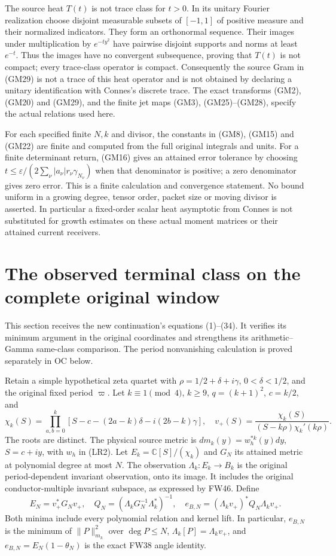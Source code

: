 The source heat $T(t)$ is not trace class for $t>0$.  In its unitary
Fourier realization choose disjoint measurable subsets of $[-1,1]$
of positive measure and their normalized indicators.  They form an
orthonormal sequence.  Their images under multiplication by
$e^{-ty^2}$ have pairwise disjoint supports and norms at least
$e^{-t}$.  Thus the images have no convergent subsequence, proving
that $T(t)$ is not compact; every trace-class operator is compact.
Consequently the source Gram in (GM29) is not a trace of this heat
operator and is not obtained by declaring a unitary identification
with Connes's discrete trace.  The exact transforms (GM2), (GM20)
and (GM29), and the finite jet maps (GM3), (GM25)--(GM28), specify
the actual relations used here.

For each specified finite $N,k$ and divisor, the constants in
(GM8), (GM15) and (GM22) are finite and computed from the full
original integrals and units.  For a finite determinant return,
(GM16) gives an attained error tolerance by choosing
$t\leq\varepsilon/(2\sum_\nu|a_\nu|r_\nu\gamma_{N_\nu})$
when that denominator is positive; a zero denominator gives zero
error.  This is a finite calculation and convergence statement.
No bound uniform in a growing degree, tensor order, packet size or
moving divisor is asserted.  In particular a fixed-order scalar
heat asymptotic from Connes is not substituted for growth estimates
on these actual moment matrices or their attained current receivers.

\section{The observed terminal class on the complete original window}
This section receives the new continuation's equations (1)--(34).
It verifies its minimum argument in the original coordinates and
strengthens its arithmetic--Gamma same-class comparison. The period
nonvanishing calculation is proved separately in OC below.

Retain a simple hypothetical zeta quartet with
$\rho=1/2+\delta+i\gamma$, $0<\delta<1/2$, and the original fixed
period $\varpi$. Let $k\equiv1\pmod4$, $k\ge9$,
$q=(k+1)^2$, $c=k/2$, and
\[
 \chi_k(S)=\prod_{a,b=0}^k[S-c-(2a-k)\delta-i(2b-k)\gamma],\quad
 v_+(S)=\frac{\chi_k(S)}{(S-k\rho)\chi_k'(k\rho)}.\tag{OB1}
\]
The roots are distinct. The physical source metric is
$dm_k(y)=w_h^{*k}(y)dy$, $S=c+iy$, with $w_h$ in (LR2).
Let $E_k=\mathbb C[S]/(\chi_k)$ and $G_N$ its attained metric at
polynomial degree at most $N$. The observation $\Lambda_k:E_k\to B_k$
is the original period-dependent invariant observation, onto its image.
It includes the original conductor-multiple invariant subspace, as
expressed by FW46. Define
\[
 E_N=v_+^*G_Nv_+,\quad Q_N=(\Lambda_kG_N^{-1}\Lambda_k^*)^{-1},
 \quad e_{B,N}=(\Lambda_kv_+)^*Q_N\Lambda_kv_+ .\tag{OB2}
\]
Both minima include every polynomial relation and kernel lift. In
particular, $e_{B,N}$ is the minimum of $\|P\|_{m_k}^2$ over
$\deg P\le N$, $\Lambda_k[P]=\Lambda_kv_+$, and
$e_{B,N}=E_N(1-\theta_N)$ is the exact FW38 angle identity.

